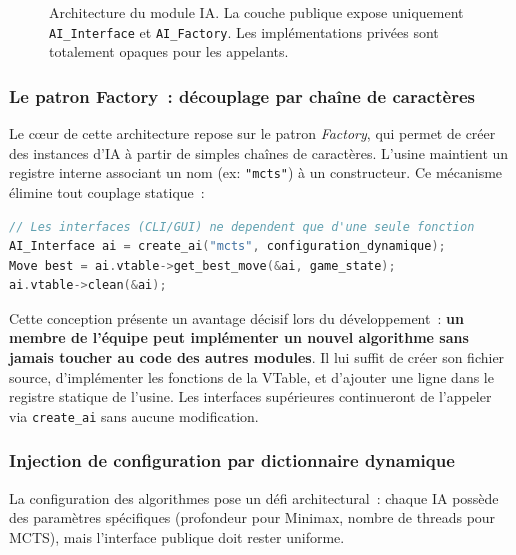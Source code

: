 \documentclass[a4paper]{article}
\begin{document}
\begin{figure}[H]
\caption{Architecture du module IA. La couche publique expose uniquement \texttt{AI\_Interface} et \texttt{AI\_Factory}. Les implémentations privées sont totalement opaques pour les appelants.}
\label{fig:ai-architecture}
\end{figure}

\subsubsection{Le patron Factory~: découplage par chaîne de caractères}

Le cœur de cette architecture repose sur le patron \textit{Factory}, qui permet de créer des instances d'IA à partir de simples chaînes de caractères. L'usine maintient un registre interne associant un nom (ex: \texttt{"mcts"}) à un constructeur. Ce mécanisme élimine tout couplage statique~:

\begin{lstlisting}[language=C, caption=Création découplée depuis l'interface publique]
// Les interfaces (CLI/GUI) ne dependent que d'une seule fonction
AI_Interface ai = create_ai("mcts", configuration_dynamique);
Move best = ai.vtable->get_best_move(&ai, game_state);
ai.vtable->clean(&ai);
\end{lstlisting}

Cette conception présente un avantage décisif lors du développement~: \textbf{un membre de l'équipe peut implémenter un nouvel algorithme sans jamais toucher au code des autres modules}. Il lui suffit de créer son fichier source, d'implémenter les fonctions de la VTable, et d'ajouter une ligne dans le registre statique de l'usine. Les interfaces supérieures continueront de l'appeler via \texttt{create\_ai} sans aucune modification.

\subsubsection{Injection de configuration par dictionnaire dynamique}

La configuration des algorithmes pose un défi architectural~: chaque IA possède des paramètres spécifiques (profondeur pour Minimax, nombre de threads pour MCTS), mais l'interface publique doit rester uniforme. 
\end{document}
